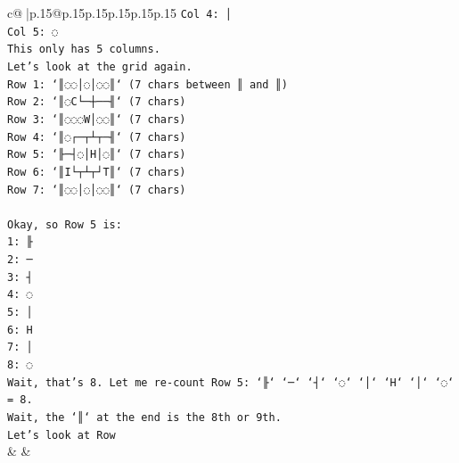 \documentclass{article}
\begin{document}
{\begin{supertabular}{c@{$\;$}|p{.15\linewidth}@{}p{.15\linewidth}p{.15\linewidth}p{.15\linewidth}p{.15\linewidth}p{.15\linewidth}}
{{{\texttt{Col 4: │} \\
\texttt{Col 5: ◌} \\
\texttt{This only has 5 columns.} \\
\texttt{Let's look at the grid again.} \\
\texttt{Row 1: `║◌◌│◌│◌◌║` (7 chars between ║ and ║)} \\
\texttt{Row 2: `║◌C└─┼──╢` (7 chars)} \\
\texttt{Row 3: `║◌◌◌W│◌◌║` (7 chars)} \\
\texttt{Row 4: `║◌┌─┬┴┬─╢` (7 chars)} \\
\texttt{Row 5: `╟─┤◌│H│◌║` (7 chars)} \\
\texttt{Row 6: `║I└┬┴┬┘T║` (7 chars)} \\
\texttt{Row 7: `║◌◌│◌│◌◌║` (7 chars)} \\
\\ 
\texttt{Okay, so Row 5 is:} \\
\texttt{1: ╟} \\
\texttt{2: ─} \\
\texttt{3: ┤} \\
\texttt{4: ◌} \\
\texttt{5: │} \\
\texttt{6: H} \\
\texttt{7: │} \\
\texttt{8: ◌} \\
\texttt{Wait, that's 8. Let me re{-}count Row 5: `╟` `─` `┤` `◌` `│` `H` `│` `◌` = 8.} \\
\texttt{Wait, the `║` at the end is the 8th or 9th.} \\
\texttt{Let's look at Row} \\
            }
        }
    }
    & & \\ \\


\end{supertabular}}
\end{document}
